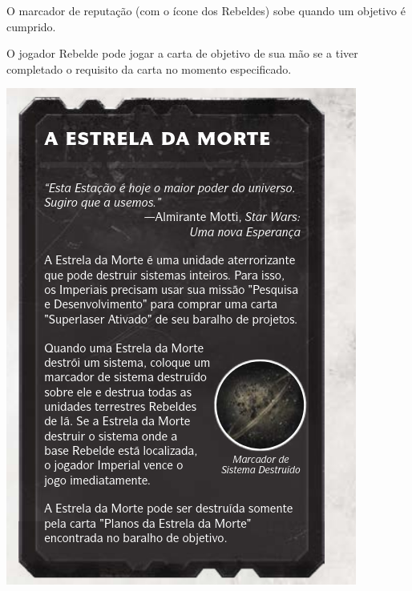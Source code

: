 \documentclass[11pt]{article}
\begin{document}
O marcador de reputação (com o ícone dos Rebeldes) sobe quando um objetivo é cumprido.

O jogador Rebelde pode jogar a carta de objetivo de sua mão se a tiver completado o requisito da carta no momento especificado.

\begin{center}
\includegraphics[width=.9\linewidth]{./death-star.png}
\end{center}
\end{document}
